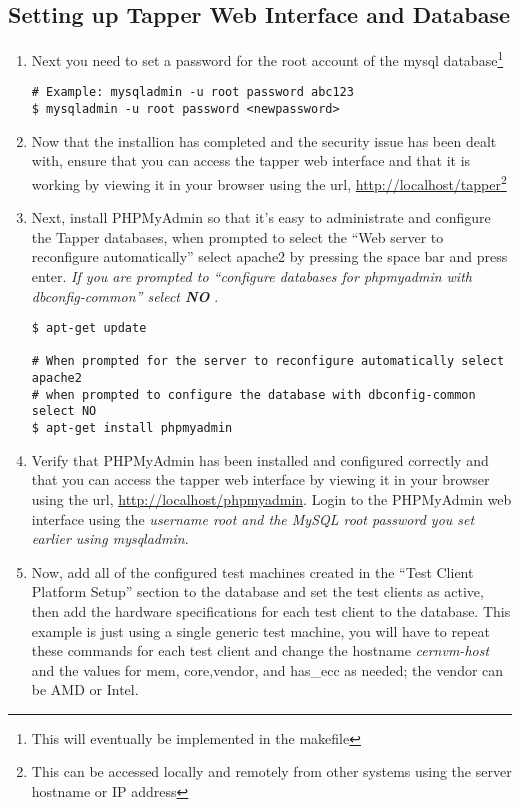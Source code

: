 \newpage
\subsection{Setting up Tapper Web Interface and Database}
\begin{enumerate}
\item 	Next you need to set a password for the root account of the mysql database\footnote{This will eventually be implemented in the 
		makefile}

\lstset{language=bash,caption= Set MySQL Root Password}
\begin{lstlisting}
# Example: mysqladmin -u root password abc123
$ mysqladmin -u root password <newpassword>
\end{lstlisting}

\item 	Now that the installion has completed and the security issue has been dealt with, ensure that you can access the tapper web
		interface and that it is working by viewing it in your browser using the url, \url{http://localhost/tapper}\footnote{This can be accessed
		locally and remotely from other systems using the server hostname or IP address}

\item 	Next, install PHPMyAdmin so that it's easy to administrate and configure the Tapper databases, when prompted to select the
		``Web server to reconfigure automatically'' select apache2 by pressing the space bar and press enter. \emph{If you are 
		prompted to ``configure databases for phpmyadmin with dbconfig-common'' select {\bf NO} }.

\lstset{language=bash,caption= Install PHPMyAdmin}
\begin{lstlisting}
$ apt-get update

# When prompted for the server to reconfigure automatically select apache2
# when prompted to configure the database with dbconfig-common select NO
$ apt-get install phpmyadmin
\end{lstlisting}

\item	Verify that PHPMyAdmin has been installed and configured correctly and that you can access the tapper web
		interface by viewing it in your browser using the url, \url{http://localhost/phpmyadmin}. Login to the PHPMyAdmin
		web interface using the \emph{username root and the MySQL root password you set earlier using mysqladmin}.

\item 	Now, add all of the configured test machines created in the ``Test Client Platform Setup'' section to the
		\tapper database and set the test clients as active, then add the hardware specifications for each test client
		to the database. This example is just using a single generic test machine, you will have to repeat these commands
		for each test client and change the hostname \emph{cernvm-host} and the values for mem, core,vendor, and has\_ecc 
		as needed; the vendor can be AMD or Intel.
		

\end{enumerate}
